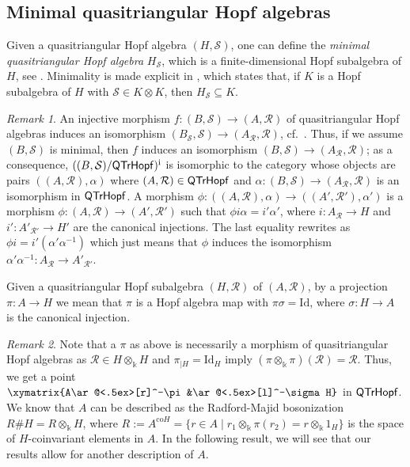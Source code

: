 \documentclass[nosumlimits,twoside]{amsart}
\theoremstyle{definition}
\theoremstyle{remark}
\newtheorem{remark}[remark]{\sc Remark}
\newcommand{\rd}[1]{{\color{red}{#1}}}
\newcommand{\id}{\mathrm{Id}}
\newcommand{\Rr}{\mathcal{R}}
\newcommand{\Ss}{\mathcal{S}}
\newcommand{\ot}{\otimes}
\def\QTrHopf{{\sf QTrHopf}}
\begin{document}
\subsection{Minimal quasitriangular Hopf algebras}
Given a quasitriangular Hopf algebra $(H, \mathcal{S})$, one can define the \textit{minimal quasitriangular Hopf algebra} $H_{\Ss}$, which is a finite-dimensional Hopf
subalgebra of $H$, see \cite[Proposition 12.2.13]{Radford-book}. Minimality is made explicit in \cite[Exercise 12.2.9]{Radford-book}, which states that, if $K$ is a Hopf subalgebra of $H$ with $\Ss\in K\otimes K$, then $H_{\Ss}\subseteq K$.

\begin{remark}%
\label{rmk:coslicemin}
An injective morphism $f:(B,\Ss)\to (A,\Rr)$  of quasitriangular Hopf algebras induces an isomorphism $(B_{\Ss},\Ss)\to (A_{\Rr},\Rr)$, cf.\ \cite[Lemma 1]{Radford-min}. Thus, if we assume $(B,\Ss)$ is minimal, then $f$ induces an isomorphism $(B,\Ss)\to (A_{\Rr},\Rr)$; as a consequence,  $((B,\Ss)/\QTrHopf)^{\mathrm{i}}$ is isomorphic to the category whose objects are pairs $((A,\Rr),\alpha)$ where $(A,\Rr)\in \QTrHopf$ and $\alpha:(B,\Ss)\to (A_{\Rr},\Rr)$ is an isomorphism in $\QTrHopf$. A morphism $\phi:((A,\Rr),\alpha)\to ((A',\Rr'),\alpha')$ is a morphism $\phi:(A,\Rr)\to (A',\Rr')$ such that $\phi i\alpha =i'\alpha'$, where $i:A_{\Rr}\to H$ and $i':A'_{\Rr'}\to H'$ are the canonical injections. The last equality rewrites as $\phi i=i'(\alpha' \alpha^{-1})$ which just means that $\phi$ induces the isomorphism $\alpha'\alpha^{-1}:A_{\Rr}\to A'_{\Rr'}$.
\end{remark}

Given a quasitriangular Hopf subalgebra $(H,\Rr)$ of $(A,\Rr)$, by a projection $\pi:A\to H$ we mean that $\pi$ is a Hopf algebra map with $\pi\sigma=\id$, where $\sigma:H\to A$ is the canonical injection.

\begin{remark}
\label{rmk:pointquasi}
Note that a $\pi$ as above is necessarily a morphism of quasitriangular Hopf algebras as $\Rr\in H\otimes_\Bbbk H$ and $\pi_{\mid H}=\id_H$ imply  $(\pi\otimes_\Bbbk\pi)(\Rr)=\Rr.$ Thus, we get a point $\xymatrix{A\ar@<.5ex>[r]^-\pi&\ar@<.5ex>[l]^-\sigma H}$ in $\QTrHopf$. We know that $A$ can be described as the Radford-Majid bosonization $R\# H=R\otimes_\Bbbk H$, where $R:=A^{\mathrm{co}H}=\{r\in A\mid r_1\ot_\Bbbk\pi(r_2)=r\ot_\Bbbk1_H\}$ is the space of $H$-coinvariant elements in $A$. In the following result, we will see that our results allow for another description of $A$.
\end{remark}
\end{document}

